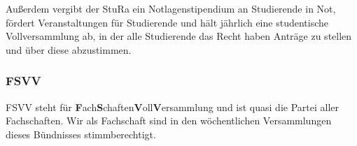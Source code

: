 
Außerdem vergibt der StuRa ein Notlagenstipendium an Studierende in Not, fördert
Veranstaltungen für Studierende und hält jährlich eine studentische Vollversammlung
ab, in der alle Studierende das Recht haben Anträge zu stellen und über diese abzustimmen.



\subsubsection{FSVV}
FSVV steht für \textbf{F}ach\textbf{S}chaften\textbf{V}oll\textbf{V}ersammlung und ist
quasi die Partei aller Fachschaften. Wir als Fachschaft sind in den wöchentlichen Versammlungen dieses Bündnisses stimmberechtigt.

